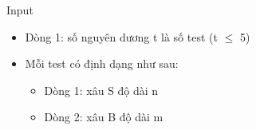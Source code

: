 Input  
\begin{itemize}
	\item     Dòng 1: số nguyên dương t là số test (t  $\le$  5)   
	\item     Mỗi test có định dạng như sau:    
\begin{itemize}
	\item       Dòng 1: xâu S độ dài n     
	\item       Dòng 2: xâu B độ dài m     
\end{itemize}
\end{itemize}